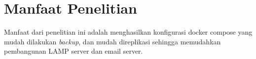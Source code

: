 \documentclass[./bab_1.tex]{subfiles}
\begin{document}
\section{Manfaat Penelitian}
\paragraph*{} Manfaat dari penelitian ini adalah
menghasilkan konfigurasi docker compose yang mudah dilakukan
\textit{backup}, dan mudah direplikasi sehingga
memudahkan pembangunan LAMP server dan email server.
\end{document}

